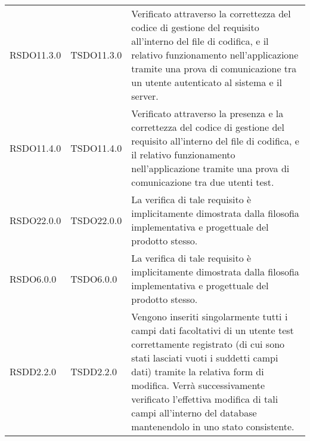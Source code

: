 \begin{center}
\begin{longtable}{llp{}}
RSDO11.3.0 & TSDO11.3.0 & Verificato attraverso la correttezza del codice di gestione del requisito all'interno del file di codifica, e il relativo funzionamento nell'applicazione tramite una prova di comunicazione tra un utente autenticato al sistema e il server.\\
RSDO11.4.0 & TSDO11.4.0& Verificato attraverso la presenza e la correttezza del codice di gestione del requisito all'interno del file di codifica, e il relativo funzionamento nell'applicazione tramite una prova di comunicazione tra due utenti test.\\
RSDO22.0.0 & TSDO22.0.0 & La verifica di tale requisito è implicitamente dimostrata dalla filosofia implementativa e progettuale del prodotto stesso.\\
RSDO6.0.0 & TSDO6.0.0 & La verifica di tale requisito è implicitamente dimostrata dalla filosofia implementativa e progettuale del prodotto stesso.\\

RSDD2.2.0 & TSDD2.2.0&Vengono inseriti singolarmente tutti i campi dati facoltativi di un utente test correttamente registrato (di cui sono stati lasciati vuoti i suddetti campi dati) tramite la relativa form di modifica. Verrà successivamente verificato l'effettiva modifica di tali campi all'interno del database mantenendolo in uno stato consistente.\\

\bottomrule
\end{longtable}
\end{center}





